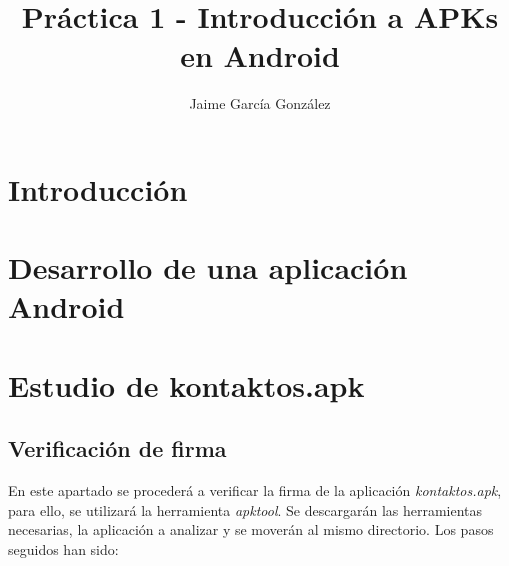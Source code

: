 \documentclass[a4paper,11pt,oneside]{book}
\title{Práctica 1 - Introducción a APKs en Android}
\author{Jaime García González}
\date{}
\begin{document}
\maketitle
\tableofcontents


\chapter{Introducción}

\chapter{Desarrollo de una aplicación Android}

\chapter{Estudio de kontaktos.apk}


\section{Verificación de firma}

En este apartado se procederá a verificar la firma de la aplicación \emph{kontaktos.apk}, para ello, se utilizará la herramienta \emph{apktool}. Se descargarán las herramientas necesarias, la aplicación a analizar y se moverán al mismo directorio. Los pasos seguidos han sido:
\end{document}

